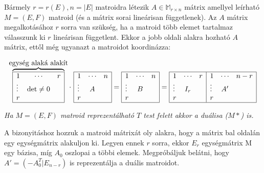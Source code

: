 Bármely $r=r(E), n=|E|$ matroidra létezik $A \in \mathbb{M}_{r\times n}$ mátrix
amellyel leírható $M=(E,F)$ matroid (és a mátrix sorai lineárisan függetlenek).
Az $A$ mátrix megalkotásához $r$ sorra van szükség, ha a matroid több elemet
tartalmaz válasszunk ki $r$ lineárisan függetlent. Ekkor a jobb oldali alakra
hozható $A$ mátrix, ettől még ugyanazt a matroidot koordinázza:

\[
\overbrace{
\begin{array}{|lcr|}
\hline
1 & \cdots & r\\
\vdots  & \mbox{det} \neq 0 &\\
r &  & \\
\hline
\end{array}}^{\mbox{egység alaká alakít}}
\cdot~
\begin{array}{|lcr|}
\hline
1 & \cdots & n\\
\vdots  & A &\\
r &  & \\
\hline
\end{array}
=
\begin{array}{|lcr|}
\hline
1 & \cdots & n\\
\vdots  & B &\\
r &  & \\
\hline
\end{array}
=
\begin{array}{|lcr|lcr|}
\hline
1 & \cdots & r &1&\cdots&n-r\\
\vdots  & I_r &&\vdots&A'&\\
r &  & & r&&\\
\hline
\end{array}
\]

\emph{Ha $M=(E,F)$ matroid reprezentálható $T$ test felett akkor a duálisa ($M*$) is.}

A bizonyitáshoz hozzuk a matroid mátrixát oly alakra, hogy a mátrix bal oldalán
egy egységmátrix alakuljon ki. Legyen ennek $r$ sorra, ekkor $E_r$ egységmátrix
M egy bázisa, míg $A_0$ oszlopai a többi elemek. Megpróbáljuk belátni, hogy $A'=(-A_0^T|E_{n-r})$
is reprezentálja a duális matroidot.

